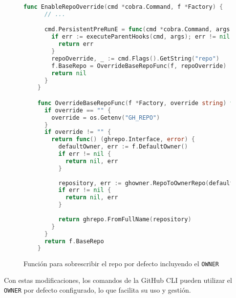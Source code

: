 \begin{figure}[H]
  \begin{lstlisting}[language=GO]
    func EnableRepoOverride(cmd *cobra.Command, f *Factory) {
      // ...

      cmd.PersistentPreRunE = func(cmd *cobra.Command, args []string) error {
        if err := executeParentHooks(cmd, args); err != nil {
          return err
        }
        repoOverride, _ := cmd.Flags().GetString("repo")
        f.BaseRepo = OverrideBaseRepoFunc(f, repoOverride)
        return nil
      }
    }

    func OverrideBaseRepoFunc(f *Factory, override string) func() (ghrepo.Interface, error) {
      if override == "" {
        override = os.Getenv("GH_REPO")
      }
      if override != "" {
        return func() (ghrepo.Interface, error) {
          defaultOwner, err := f.DefaultOwner()
          if err != nil {
            return nil, err
          }
      
          repository, err := ghowner.RepoToOwnerRepo(defaultOwner, override)
          if err != nil {
            return nil, err
          }
      
          return ghrepo.FromFullName(repository)
        }
      }
      return f.BaseRepo
    }
  \end{lstlisting}
  \caption{Función para sobrescribir el repo por defecto incluyendo el \texttt{OWNER}}
  \label{fig:overrideRepo}
\end{figure}

Con estas modificaciones, los comandos de la GitHub CLI pueden utilizar el \texttt{OWNER} por defecto configurado, lo que facilita su uso y gestión.
